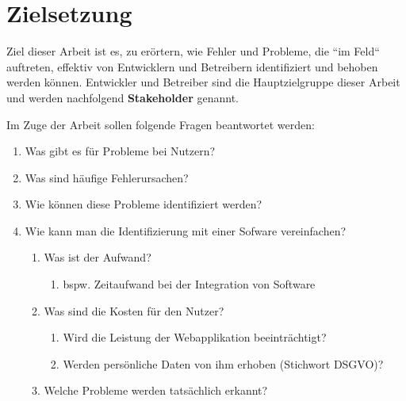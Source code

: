 \section{Zielsetzung}

Ziel dieser Arbeit ist es, zu erörtern, wie Fehler und Probleme, die ``im Feld`` auftreten, effektiv von Entwicklern und Betreibern identifiziert und behoben werden können. Entwickler und Betreiber sind die Hauptzielgruppe dieser Arbeit und werden nachfolgend \textbf{Stakeholder} genannt.

Im Zuge der Arbeit sollen folgende Fragen beantwortet werden:

\begin{enumerate}
	\item Was gibt es für Probleme bei Nutzern?
	\item Was sind häufige Fehlerursachen?
	\item Wie können diese Probleme identifiziert werden?
	\item Wie kann man die Identifizierung mit einer Sofware vereinfachen?
	\begin{enumerate}
		\item Was ist der Aufwand?
		\begin{enumerate}
			\item bspw. Zeitaufwand bei der Integration von Software
		\end{enumerate}
		\item Was sind die Kosten für den Nutzer?
		\begin{enumerate}
			\item Wird die Leistung der Webapplikation beeinträchtigt?
			\item Werden persönliche Daten von ihm erhoben (Stichwort DSGVO)?
		\end{enumerate}
		\item Welche Probleme werden tatsächlich erkannt?
	\end{enumerate}
\end{enumerate}

